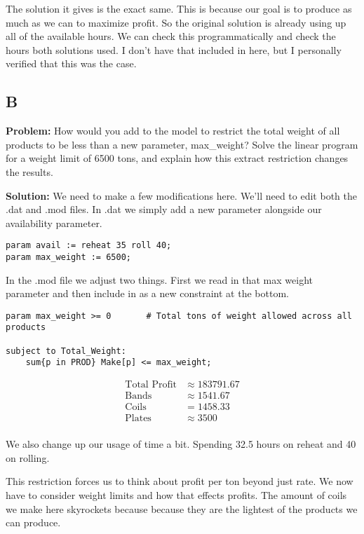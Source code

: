 The solution it gives is the exact same. This is because our goal is to produce as much as we can to maximize profit. So the original solution is already using up all of the available hours. We can check this programmatically and check the hours both solutions used. I don't have that included in here, but I personally verified that this was the case. 

\subsection*{B}

\textbf{Problem:} How would you add to the model to restrict the total weight of all products to be less than a new parameter, max\_weight? Solve the linear program for a weight limit of 6500 tons, and explain how this extract restriction changes the results.

\noindent\textbf{Solution:} We need to make a few modifications here. We'll need to edit both the .dat and .mod files. In .dat we simply add a new parameter alongside our availability parameter.

\begin{lstlisting}
param avail := reheat 35 roll 40;
param max_weight := 6500; 
\end{lstlisting}

In the .mod file we adjust two things. First we read in that max weight parameter and then include in as a new constraint at the bottom.

\begin{lstlisting}
param max_weight >= 0		# Total tons of weight allowed across all products

subject to Total_Weight:
	sum{p in PROD} Make[p] <= max_weight;
\end{lstlisting}

\begin{align*}
	\text{Total Profit} &\approx 183791.67 \\
	\text{Bands} &\approx 1541.67 \\
	\text{Coils} &= 1458.33 \\
	\text{Plates} &\approx 3500 \\
\end{align*}

We also change up our usage of time a bit. Spending 32.5 hours on reheat and 40 on rolling. 

This restriction forces us to think about profit per ton beyond just rate. We now have to consider weight limits and how that effects profits. The amount of coils we make here skyrockets because because they are the lightest of the products we can produce.

